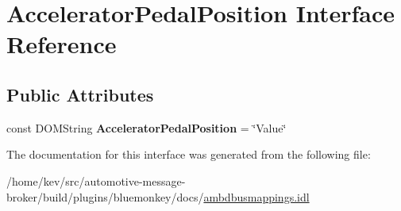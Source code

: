 \hypertarget{interfaceAcceleratorPedalPosition}{\section{Accelerator\+Pedal\+Position Interface Reference}
\label{interfaceAcceleratorPedalPosition}
}
\subsection*{Public Attributes}
\begin{DoxyCompactItemize}
\item 
\hypertarget{interfaceAcceleratorPedalPosition_afb7c6ff4c0f1eb7293376f3eba1d0d0d}{const D\+O\+M\+String {\bfseries Accelerator\+Pedal\+Position} = \char`\"{}Value\char`\"{}}\label{interfaceAcceleratorPedalPosition_afb7c6ff4c0f1eb7293376f3eba1d0d0d}

\end{DoxyCompactItemize}


The documentation for this interface was generated from the following file\+:\begin{DoxyCompactItemize}
\item 
/home/kev/src/automotive-\/message-\/broker/build/plugins/bluemonkey/docs/\hyperlink{ambdbusmappings_8idl}{ambdbusmappings.\+idl}\end{DoxyCompactItemize}
